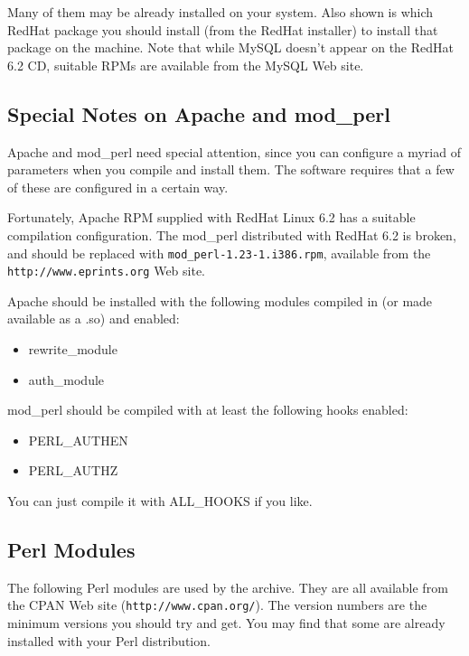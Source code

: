 
Many of them may be already installed on your system. Also shown is which RedHat package you should install (from the RedHat installer) to install that package on the machine. Note that while MySQL doesn't appear on the RedHat 6.2 CD, suitable RPMs are available from the MySQL Web site.


\subsection{Special Notes on Apache and mod\_perl}

Apache and mod\_perl need special attention, since you can configure a myriad of parameters when you compile and install them. The software requires that a few of these are configured in a certain way.

Fortunately, Apache RPM supplied with RedHat Linux 6.2 has a suitable compilation configuration. The mod\_perl distributed with RedHat 6.2 is broken, and should be replaced with {\tt mod\_perl-1.23-1.i386.rpm}, available from the {\tt http://www.eprints.org} Web site.

Apache should be installed with the following modules compiled in (or made available as a .so) and enabled:

\begin{itemize}
\item rewrite\_module
\item auth\_module
\end{itemize}

mod\_perl should be compiled with at least the following hooks enabled:

\begin{itemize}
\item PERL\_AUTHEN
\item PERL\_AUTHZ
\end{itemize}

You can just compile it with ALL\_HOOKS if you like.


\subsection{Perl Modules}

The following Perl modules are used by the \eprints archive. They are all available from the CPAN Web site ({\tt http://www.cpan.org/}). The version numbers are the minimum versions you should try and get. You may find that some are already installed with your Perl distribution.

